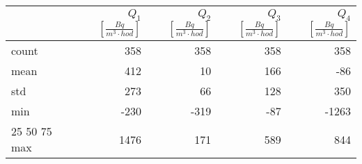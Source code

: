 \begin{tabular}{lrrrr}
\toprule
{} &  $Q_1$ $\left[\si{\frac{Bq}{m^3\cdot hod}}\right]$ &  $Q_2$ $\left[\si{\frac{Bq}{m^3\cdot hod}}\right]$ &  $Q_3$ $\left[\si{\frac{Bq}{m^3\cdot hod}}\right]$ &  $Q_4$ $\left[\si{\frac{Bq}{m^3\cdot hod}}\right]$ \\
\midrule
count &                                                358 &                                                358 &                                                358 &                                                358 \\
mean  &                                                412 &                                                 10 &                                                166 &                                                -86 \\
std   &                                                273 &                                                 66 &                                                128 &                                                350 \\
min   &                                               -230 &                                               -319 &                                                -87 &                                              -1263 \\
25%
50%
75%
max   &                                               1476 &                                                171 &                                                589 &                                                844 \\
\bottomrule
\end{tabular}
